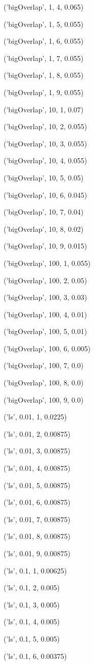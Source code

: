 \documentclass{paper}
\begin{document}
\begin{enumerate}
('bigOverlap', 1, 4, 0.065)

('bigOverlap', 1, 5, 0.055)

('bigOverlap', 1, 6, 0.055)

('bigOverlap', 1, 7, 0.055)

('bigOverlap', 1, 8, 0.055)

('bigOverlap', 1, 9, 0.055)

('bigOverlap', 10, 1, 0.07)

('bigOverlap', 10, 2, 0.055)

('bigOverlap', 10, 3, 0.055)

('bigOverlap', 10, 4, 0.055)

('bigOverlap', 10, 5, 0.05)

('bigOverlap', 10, 6, 0.045)

('bigOverlap', 10, 7, 0.04)

('bigOverlap', 10, 8, 0.02)

('bigOverlap', 10, 9, 0.015)

('bigOverlap', 100, 1, 0.055)

('bigOverlap', 100, 2, 0.05)

('bigOverlap', 100, 3, 0.03)

('bigOverlap', 100, 4, 0.01)

('bigOverlap', 100, 5, 0.01)

('bigOverlap', 100, 6, 0.005)

('bigOverlap', 100, 7, 0.0)

('bigOverlap', 100, 8, 0.0)

('bigOverlap', 100, 9, 0.0)

('ls', 0.01, 1, 0.0225)

('ls', 0.01, 2, 0.00875)

('ls', 0.01, 3, 0.00875)

('ls', 0.01, 4, 0.00875)

('ls', 0.01, 5, 0.00875)

('ls', 0.01, 6, 0.00875)

('ls', 0.01, 7, 0.00875)

('ls', 0.01, 8, 0.00875)

('ls', 0.01, 9, 0.00875)

('ls', 0.1, 1, 0.00625)

('ls', 0.1, 2, 0.005)

('ls', 0.1, 3, 0.005)

('ls', 0.1, 4, 0.005)

('ls', 0.1, 5, 0.005)

('ls', 0.1, 6, 0.00375)


\end{enumerate}
\end{document}

